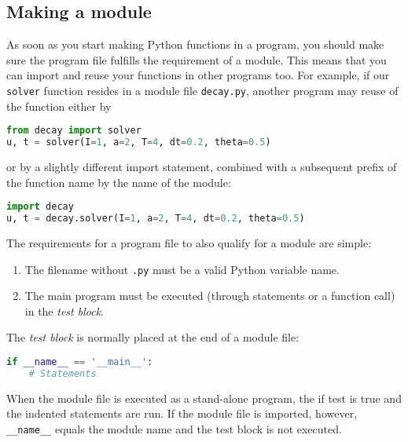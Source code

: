 \documentclass[graybox,sectrefs,envcountresetchap,open=right,final]{svmonodo}
\begin{document}
\subsection{Making a module}
\label{softeng1:basic:module}

As soon as you start making Python functions in a program, you should
make sure the program file fulfills the requirement of a module.
This means that you can import and reuse your functions in other
programs too. For example, if our \texttt{solver} function resides in a
module file \texttt{decay.py}, another program may reuse of the
function either by




\begin{lstlisting}[language=python,style=blue1_bluegreen]
from decay import solver
u, t = solver(I=1, a=2, T=4, dt=0.2, theta=0.5)

\end{lstlisting}

or by a slightly different import statement, combined with a subsequent
prefix of the function name by the name of the module:




\begin{lstlisting}[language=python,style=blue1_bluegreen]
import decay
u, t = decay.solver(I=1, a=2, T=4, dt=0.2, theta=0.5)

\end{lstlisting}


The requirements for a program file to also qualify for a module are simple:

\begin{enumerate}
\item The filename without \texttt{.py} must be a valid Python variable name.

\item The main program must be executed (through statements or a function call) in the \emph{test block}.
\end{enumerate}

\noindent
The \emph{test block} is normally placed at the end of a module file:




\begin{lstlisting}[language=python,style=blue1_bluegreen]
if __name__ == '__main__':
    # Statements

\end{lstlisting}

When the module file is executed as a stand-alone program, the if test
is true and the indented statements are run. If the module file
is imported, however, \Verb!__name__! equals the module name and the test block
is not executed.
\end{document}
